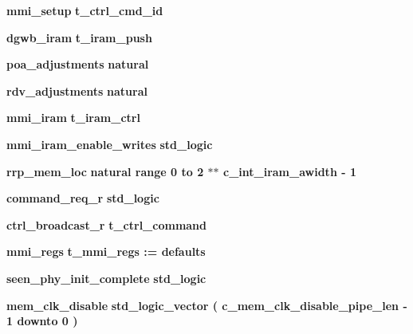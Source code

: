 \begin{DoxyCompactItemize}
\item 
{\bf mmi\+\_\+setup} {\bfseries \textcolor{vhdlchar}{t\+\_\+ctrl\+\_\+cmd\+\_\+id}\textcolor{vhdlchar}{ }} 
\item 
{\bf dgwb\+\_\+iram} {\bfseries \textcolor{vhdlchar}{t\+\_\+iram\+\_\+push}\textcolor{vhdlchar}{ }} 
\item 
{\bf poa\+\_\+adjustments} {\bfseries \textcolor{comment}{natural}\textcolor{vhdlchar}{ }} 
\item 
{\bf rdv\+\_\+adjustments} {\bfseries \textcolor{comment}{natural}\textcolor{vhdlchar}{ }} 
\item 
{\bf mmi\+\_\+iram} {\bfseries \textcolor{vhdlchar}{t\+\_\+iram\+\_\+ctrl}\textcolor{vhdlchar}{ }} 
\item 
{\bf mmi\+\_\+iram\+\_\+enable\+\_\+writes} {\bfseries \textcolor{comment}{std\+\_\+logic}\textcolor{vhdlchar}{ }} 
\item 
{\bf rrp\+\_\+mem\+\_\+loc} {\bfseries \textcolor{comment}{natural}\textcolor{vhdlchar}{ }\textcolor{vhdlchar}{ }\textcolor{vhdlchar}{ }\textcolor{keywordflow}{range}\textcolor{vhdlchar}{ }\textcolor{vhdlchar}{ } \textcolor{vhdldigit}{0} \textcolor{vhdlchar}{ }\textcolor{keywordflow}{to}\textcolor{vhdlchar}{ }\textcolor{vhdlchar}{ } \textcolor{vhdldigit}{2} \textcolor{vhdlchar}{$\ast$}\textcolor{vhdlchar}{$\ast$}\textcolor{vhdlchar}{ }\textcolor{vhdlchar}{ }\textcolor{vhdlchar}{ }{\bfseries {\bf c\+\_\+int\+\_\+iram\+\_\+awidth}} \textcolor{vhdlchar}{-\/}\textcolor{vhdlchar}{ } \textcolor{vhdldigit}{1} \textcolor{vhdlchar}{ }} 
\item 
{\bf command\+\_\+req\+\_\+r} {\bfseries \textcolor{comment}{std\+\_\+logic}\textcolor{vhdlchar}{ }} 
\item 
{\bf ctrl\+\_\+broadcast\+\_\+r} {\bfseries \textcolor{vhdlchar}{t\+\_\+ctrl\+\_\+command}\textcolor{vhdlchar}{ }} 
\item 
{\bf mmi\+\_\+regs} {\bfseries \textcolor{vhdlchar}{t\+\_\+mmi\+\_\+regs}\textcolor{vhdlchar}{ }\textcolor{vhdlchar}{ }\textcolor{vhdlchar}{\+:}\textcolor{vhdlchar}{=}\textcolor{vhdlchar}{ }\textcolor{vhdlchar}{ }\textcolor{vhdlchar}{ }\textcolor{vhdlchar}{ }\textcolor{vhdlchar}{defaults}\textcolor{vhdlchar}{ }} 
\item 
{\bf seen\+\_\+phy\+\_\+init\+\_\+complete} {\bfseries \textcolor{comment}{std\+\_\+logic}\textcolor{vhdlchar}{ }} 
\item 
{\bf mem\+\_\+clk\+\_\+disable} {\bfseries \textcolor{comment}{std\+\_\+logic\+\_\+vector}\textcolor{vhdlchar}{ }\textcolor{vhdlchar}{(}\textcolor{vhdlchar}{ }\textcolor{vhdlchar}{ }\textcolor{vhdlchar}{ }\textcolor{vhdlchar}{ }{\bfseries {\bf c\+\_\+mem\+\_\+clk\+\_\+disable\+\_\+pipe\+\_\+len}} \textcolor{vhdlchar}{-\/}\textcolor{vhdlchar}{ } \textcolor{vhdldigit}{1} \textcolor{vhdlchar}{ }\textcolor{keywordflow}{downto}\textcolor{vhdlchar}{ }\textcolor{vhdlchar}{ } \textcolor{vhdldigit}{0} \textcolor{vhdlchar}{ }\textcolor{vhdlchar}{)}\textcolor{vhdlchar}{ }} 

\end{DoxyCompactItemize}
